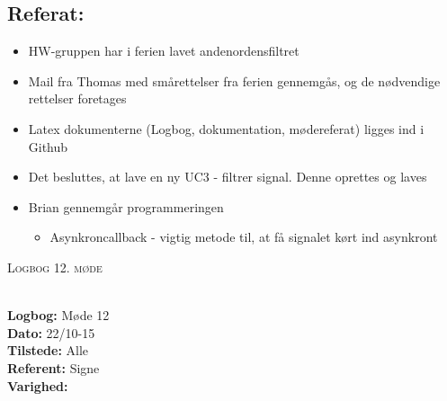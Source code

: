 \documentclass[a4paper,11pt,oneside]{memoir}
\begin{document}
\subsection{Referat:}
\begin{itemize}
\item HW-gruppen har i ferien lavet andenordensfiltret
\item Mail fra Thomas med smårettelser fra ferien gennemgås, og de nødvendige rettelser foretages
\item Latex dokumenterne (Logbog, dokumentation, mødereferat) ligges ind i Github 
\item Det besluttes, at lave en ny UC3 - filtrer signal. Denne oprettes og laves
\item Brian gennemgår programmeringen
\begin{itemize}
\item Asynkroncallback - vigtig metode til, at få signalet kørt ind asynkront
\end{itemize}
\end{itemize}

\newpage


\begin{center} 
\huge{\textsc{Logbog 12. møde}}
\end{center}

\textbf{ }
\\
\textbf{Logbog:} Møde 12
\\
\textbf{Dato:} 22/10-15
\\
\textbf{Tilstede:} Alle
\\
\textbf{Referent:} Signe
\\
\textbf{Varighed:} 
\\
\end{document}
